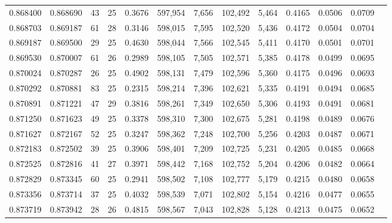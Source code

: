 \begin{tabular}{rrrrrrrrrrrrr}
0.868400 & 0.868690 &    43 &  25 &                                     0.3676 & 597,954 &   7,656 & 102,492 &   5,464 & 0.4165 & 0.0506 & 0.0709 \\
0.868703 & 0.869187 &    61 &  28 &                                     0.3146 & 598,015 &   7,595 & 102,520 &   5,436 & 0.4172 & 0.0504 & 0.0704 \\
0.869187 & 0.869500 &    29 &  25 &                                     0.4630 & 598,044 &   7,566 & 102,545 &   5,411 & 0.4170 & 0.0501 & 0.0701 \\
0.869530 & 0.870007 &    61 &  26 &                                     0.2989 & 598,105 &   7,505 & 102,571 &   5,385 & 0.4178 & 0.0499 & 0.0695 \\
0.870024 & 0.870287 &    26 &  25 &                                     0.4902 & 598,131 &   7,479 & 102,596 &   5,360 & 0.4175 & 0.0496 & 0.0693 \\
0.870292 & 0.870881 &    83 &  25 &                                     0.2315 & 598,214 &   7,396 & 102,621 &   5,335 & 0.4191 & 0.0494 & 0.0685 \\
0.870891 & 0.871221 &    47 &  29 &                                     0.3816 & 598,261 &   7,349 & 102,650 &   5,306 & 0.4193 & 0.0491 & 0.0681 \\
0.871250 & 0.871623 &    49 &  25 &                                     0.3378 & 598,310 &   7,300 & 102,675 &   5,281 & 0.4198 & 0.0489 & 0.0676 \\
0.871627 & 0.872167 &    52 &  25 &                                     0.3247 & 598,362 &   7,248 & 102,700 &   5,256 & 0.4203 & 0.0487 & 0.0671 \\
0.872183 & 0.872502 &    39 &  25 &                                     0.3906 & 598,401 &   7,209 & 102,725 &   5,231 & 0.4205 & 0.0485 & 0.0668 \\
0.872525 & 0.872816 &    41 &  27 &                                     0.3971 & 598,442 &   7,168 & 102,752 &   5,204 & 0.4206 & 0.0482 & 0.0664 \\
0.872829 & 0.873345 &    60 &  25 &                                     0.2941 & 598,502 &   7,108 & 102,777 &   5,179 & 0.4215 & 0.0480 & 0.0658 \\
0.873356 & 0.873714 &    37 &  25 &                                     0.4032 & 598,539 &   7,071 & 102,802 &   5,154 & 0.4216 & 0.0477 & 0.0655 \\
0.873719 & 0.873942 &    28 &  26 &                                     0.4815 & 598,567 &   7,043 & 102,828 &   5,128 & 0.4213 & 0.0475 & 0.0652 \\

\end{tabular}
